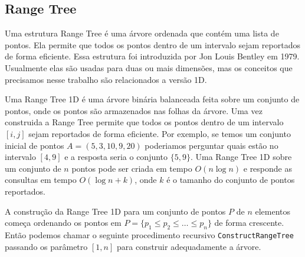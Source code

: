 \documentclass[12pt]{article}
\begin{document}
\subsection{Range Tree}
\label{rangeTree}
Uma estrutura Range Tree é uma árvore ordenada que contém uma lista 
de pontos. Ela permite que todos os pontos dentro de um intervalo sejam
reportados de forma eficiente. Essa estrutura foi introduzida por Jon Louis 
Bentley em 1979\cite{lala}. Usualmente elas são usadas para duas ou
mais dimensões, mas os conceitos que precisamos nesse trabalho são relacionados
a versão 1D.

Uma Range Tree 1D é uma árvore binária balanceada feita sobre um conjunto
de pontos, onde os pontos são armazenados nas folhas da árvore. Uma vez
construida a Range Tree permite que todos os pontos dentro de um intervalo $[i, j]$
sejam reportados de forma eficiente.  Por exemplo, se temos um conjunto inicial
de pontos $A = (5, 3, 10, 9, 20)$ poderiamos perguntar quais estão no intervalo
$[4, 9]$ e a resposta seria o conjunto $\{5, 9\}$. Uma Range Tree 1D sobre um conjunto
de $n$ pontos pode ser criada em tempo $O(n\log n)$ e responde as consultas em tempo
$O(\log n + k)$, onde $k$ é o tamanho do conjunto de pontos reportados.

A construção da Range Tree 1D para um conjunto de pontos $P$ de $n$ elementos começa
ordenando os pontos em $P = \{p_1 \le p_2 \le \ldots \le p_n \}$ de forma crescente.
Então podemos chamar o seguinte procedimento recursivo {\tt ConstructRangeTree} passando os parâmetro $[1, n]$
para construir adequadamente a árvore.
\end{document}
